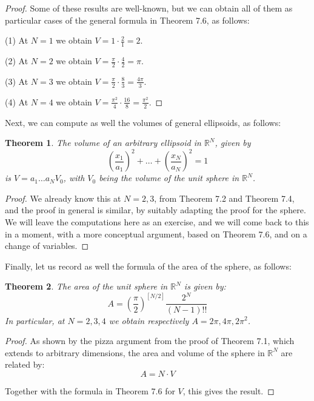 \documentclass[12pt]{amsbook}
\newtheorem{theorem}{Theorem}[chapter]
\begin{document}
\begin{proof}
Some of these results are well-known, but we can obtain all of them as particular cases of the general formula in Theorem 7.6, as follows:

\medskip

(1) At $N=1$ we obtain $V=1\cdot\frac{2}{1}=2$.

\medskip

(2) At $N=2$ we obtain $V=\frac{\pi}{2}\cdot\frac{4}{2}=\pi$.

\medskip

(3) At $N=3$ we obtain $V=\frac{\pi}{2}\cdot\frac{8}{3}=\frac{4\pi}{3}$.

\medskip

(4) At $N=4$ we obtain $V=\frac{\pi^2}{4}\cdot\frac{16}{8}=\frac{\pi^2}{2}$.
\end{proof}

Next, we can compute as well the volumes of general ellipsoids, as follows:

\begin{theorem}
The volume of an arbitrary ellipsoid in $\mathbb R^N$, given by
$$\left(\frac{x_1}{a_1}\right)^2+\ldots+\left(\frac{x_N}{a_N}\right)^2=1$$
is $V=a_1\ldots a_NV_0$, with $V_0$ being the volume of the unit sphere in $\mathbb R^N$.
\end{theorem}

\begin{proof}
We already know this at $N=2,3$, from Theorem 7.2 and Theorem 7.4, and the proof in general is similar, by suitably adapting the proof for the sphere. We will leave the computations here as an exercise, and we will come back to this in a moment, with a more conceptual argument, based on Theorem 7.6, and on a change of variables.
\end{proof}

Finally, let us record as well the formula of the area of the sphere, as follows:


\begin{theorem}
The area of the unit sphere in $\mathbb R^N$ is given by:
$$A=\left(\frac{\pi}{2}\right)^{[N/2]}\frac{2^N}{(N-1)!!}$$
In particular, at $N=2,3,4$ we obtain respectively $A=2\pi,4\pi,2\pi^2$.
\end{theorem}

\begin{proof}
As shown by the pizza argument from the proof of Theorem 7.1, which extends to arbitrary dimensions, the area and volume of the sphere in $\mathbb R^N$ are related by:
$$A=N\cdot V$$

Together with the formula in Theorem 7.6 for $V$, this gives the result.
\end{proof}
\end{document}
